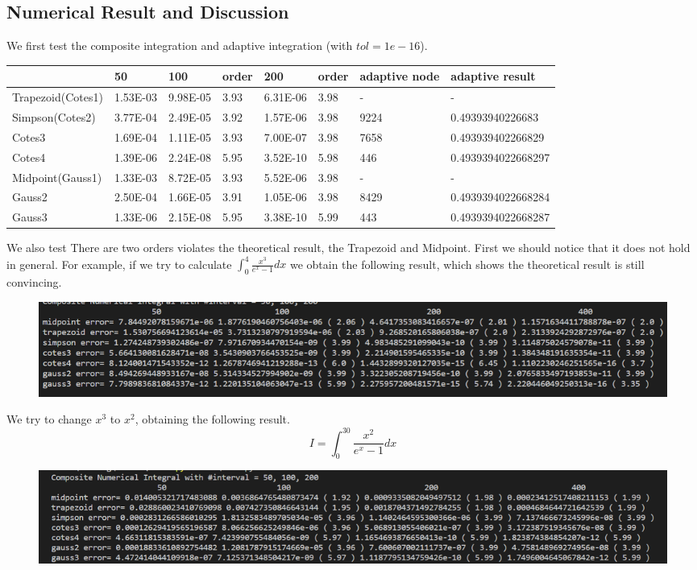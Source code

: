 \documentclass{article}
\begin{document}
\subsection{Numerical Result and Discussion}
We first test the composite integration and adaptive integration (with $tol = 1e-16$).
\begin{table}[H]
	\begin{tabular}{|l|l|l|l|l|l|l|l|}
		\hline
		& 50        & 100       & order & 200       & order & adaptive node & adaptive result    \\ \hline
		Trapezoid(Cotes1) & 1.53E-03  & 9.98E-05  & 3.93  & 6.31E-06  & 3.98  & -             & -                  \\ \hline
		Simpson(Cotes2)   & 3.77E-04 & 2.49E-05 & 3.92  & 1.57E-06 & 3.98  & 9224          & 0.49393940226683   \\ \hline
		Cotes3            & 1.69E-04 & 1.11E-05 & 3.93  &7.00E-07 & 3.98  & 7658          & 0.493939402266829  \\ \hline
		Cotes4            & 1.39E-06 & 2.24E-08 & 5.95  & 3.52E-10 & 5.98  & 446           & 0.4939394022668297 \\ \hline
		Midpoint(Gauss1)  & 1.33E-03 & 8.72E-05 & 3.93  & 5.52E-06 & 3.98  & -             & -                  \\ \hline
		Gauss2            & 2.50E-04  & 1.66E-05  & 3.91  & 1.05E-06  & 3.98  & 8429          & 0.4939394022668284 \\ \hline
		Gauss3            & 1.33E-06  & 2.15E-08  & 5.95  & 3.38E-10  & 5.99  & 443           & 0.4939394022668287 \\ \hline
	\end{tabular}
\end{table}

We also test 
There are two orders violates the theoretical result, the Trapezoid and Midpoint. First we should notice that it does not hold in general. For example, if we try to calculate $\int_0^4 \frac{x^3}{e^x-1}dx$ we obtain the following result, which shows the theoretical result is still convincing.
\begin{figure}[H]
	\centering
	\includegraphics[scale=.5]{fig1.png}
\end{figure}

We try to change $x^3$ to $x^2$, obtaining the following result. 
$$I = \int_{0}^{30}\frac{x^2}{e^x-1}dx$$
\begin{figure}[H]
	\centering
	\includegraphics[scale=.5]{fig2.png}
\end{figure}
\end{document}
